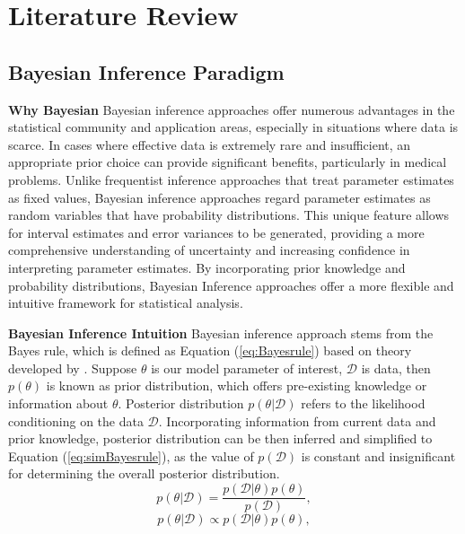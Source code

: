 \chapter{Literature Review}
\label{Chapter2}

\section{Bayesian Inference Paradigm}
\label{bayeisanP}
\textbf{Why Bayesian}
Bayesian inference approaches offer numerous advantages in the statistical community and application areas, especially in situations where data is scarce. In cases where effective data is extremely rare and insufficient, an appropriate prior choice can provide significant benefits, particularly in medical problems. Unlike frequentist inference approaches that treat parameter estimates as fixed values, Bayesian inference approaches regard parameter estimates as random variables that have probability distributions. This unique feature allows for interval estimates and error variances to be generated, providing a more comprehensive understanding of uncertainty and increasing confidence in interpreting parameter estimates. By incorporating prior knowledge and probability distributions, Bayesian Inference approaches offer a more flexible and intuitive framework for statistical analysis.

\textbf{Bayesian Inference Intuition}
Bayesian inference approach stems from the Bayes rule, which is defined as Equation (\ref{eq:Bayesrule}) based on theory developed by \cite{Beech1959}. Suppose $\theta$ is our model parameter of interest, $\mathcal{D}$ is data, then $p(\theta)$ is known as prior distribution, which offers pre-existing knowledge or information about $\theta$. Posterior distribution $p(\theta|\mathcal{D})$ refers to the likelihood conditioning on the data $\mathcal{D}$.
Incorporating information from current data and prior knowledge, posterior distribution can be then inferred and simplified to Equation (\ref{eq:simBayesrule}), as the value of $p(\mathcal{D})$ is constant and insignificant for determining the overall posterior distribution. 
\begin{equation}
	p(\theta|\mathcal{D}) = \frac{p(\mathcal{D}|\theta)p(\theta)}{p(\mathcal{D})},
	\label{eq:Bayesrule}
\end{equation}
\begin{equation}
	p(\theta|\mathcal{D}) \propto p(\mathcal{D}|\theta)p(\theta),
	\label{eq:simBayesrule}
\end{equation}
